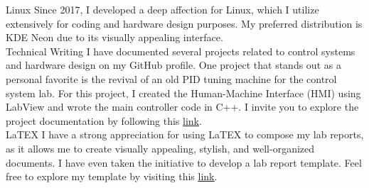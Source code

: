 
\newpage
{}

\begin{cvskills}

  \cvskill
    {Linux} %
    {Since 2017, I developed a deep affection for Linux, which I utilize extensively for coding and hardware design purposes. My preferred distribution is KDE Neon due to its visually appealing interface.}\\ %
  \cvskill
    {Technical Writing} %
    {I have documented several projects related to control systems and hardware design on my GitHub profile. One project that stands out as a personal favorite is the revival of an old PID tuning machine for the control system lab. For this project, I created the Human-Machine Interface (HMI) using LabView and wrote the main controller code in C++. I invite you to explore the project documentation by following this \href{https://github.com/justraven/Feedback-Educational-Servo-ES151-Remake}{\underline{link}}.}\\ %
  \cvskill
    {LaTEX} %
    {I have a strong appreciation for using LaTEX to compose my lab reports, as it allows me to create visually appealing, stylish, and well-organized documents. I have even taken the initiative to develop a lab report template. Feel free to explore my template by visiting this \href{https://github.com/justraven/template-laporan-praktikum-LaTEX}{\underline{link}}.} %

\end{cvskills}